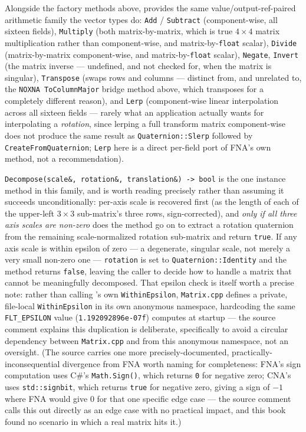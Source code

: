 Alongside the factory methods above,  provides the same
value/output-ref-paired arithmetic family the vector types do: \texttt{Add} / \texttt{Subtract}
(component-wise, all sixteen fields), \texttt{Multiply} (both matrix-by-matrix, which is true
$4\times4$ matrix multiplication rather than component-wise, and matrix-by-\texttt{float}
scalar), \texttt{Divide} (matrix-by-matrix component-wise, and matrix-by-\texttt{float}
scalar), \texttt{Negate}, \texttt{Invert} (the matrix inverse --- undefined, and not checked
for, when the matrix is singular), \texttt{Transpose} (swaps rows and columns --- distinct
from, and unrelated to, the \texttt{NOXNA ToColumnMajor} bridge method above, which transposes
for a completely different reason), and \texttt{Lerp} (component-wise linear interpolation
across all sixteen fields --- rarely what an application actually wants for interpolating a
\emph{rotation}, since lerping a full transform matrix component-wise does not produce the same
result as \texttt{Quaternion::Slerp} followed by \texttt{CreateFromQuaternion}; \texttt{Lerp}
here is a direct per-field port of FNA's own method, not a recommendation).

\texttt{Decompose(scale\&, rotation\&, translation\&) -> bool} is the one instance method in
this family, and is worth reading precisely rather than assuming it succeeds unconditionally:
per-axis scale is recovered first (as the length of each of the upper-left $3\times3$
sub-matrix's three rows, sign-corrected), and \emph{only if all three axis scales are
non-zero} does the method go on to extract a rotation quaternion from the remaining
scale-normalized rotation sub-matrix and return \texttt{true}. If any axis scale is within epsilon of zero --- a degenerate, singular scale, not merely a
very small non-zero one --- \texttt{rotation} is set to \texttt{Quaternion::Identity} and the
method returns \texttt{false}, leaving the caller to decide how to handle a matrix that cannot
be meaningfully decomposed. That epsilon check is itself worth a precise note: rather than
calling 's own \texttt{WithinEpsilon}, \texttt{Matrix.cpp} defines a
private, file-local \texttt{WithinEpsilon} in its own anonymous namespace, hardcoding the same
\texttt{FLT\_EPSILON} value (\texttt{1.192092896e-07f})  computes at
startup --- the source comment explains this duplication is deliberate, specifically to avoid
a circular dependency between \texttt{Matrix.cpp} and  from this
anonymous namespace, not an oversight. (The source carries one more precisely-documented,
practically-inconsequential divergence from FNA worth naming for completeness: FNA's sign
computation uses C\#'s \texttt{Math.Sign()}, which returns \texttt{0} for negative zero; CNA's
uses \texttt{std::signbit}, which returns \texttt{true} for negative zero, giving a
sign of $-1$ where FNA would give $0$ for that one specific edge case --- the source comment
calls this out directly as an edge case with no practical impact, and this book found no
scenario in which a real matrix hits it.)

